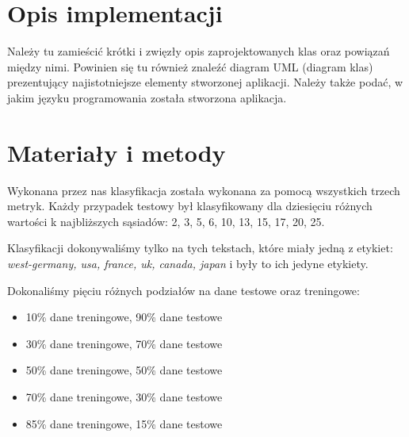 \documentclass{classrep}
\begin{document}
\begin{enumerate}

\end{enumerate}





\section{Opis implementacji} %
{\color{blue}
Należy tu zamieścić krótki i zwięzły opis zaprojektowanych klas oraz powiązań
między nimi. Powinien się tu również znaleźć diagram UML  (diagram klas)
prezentujący najistotniejsze elementy stworzonej aplikacji. Należy także
podać, w jakim języku programowania została stworzona aplikacja. }

\section{Materiały i metody} %
Wykonana przez nas klasyfikacja została wykonana za pomocą wszystkich trzech metryk. Każdy przypadek testowy był klasyfikowany dla dziesięciu różnych wartości k najbliższych sąsiadów: 2, 3, 5, 6, 10, 13, 15, 17, 20, 25.

Klasyfikacji dokonywaliśmy tylko na tych tekstach, które miały jedną z etykiet: \textsl{west-germany, usa, france, uk, canada, japan} i były to ich jedyne etykiety.

Dokonaliśmy pięciu różnych podziałów na dane testowe oraz treningowe:
\begin{itemize}
\item 10\% dane treningowe, 90\% dane testowe
\item 30\% dane treningowe, 70\% dane testowe
\item 50\% dane treningowe, 50\% dane testowe
\item 70\% dane treningowe, 30\% dane testowe
\item 85\% dane treningowe, 15\% dane testowe
\end{itemize}
\end{document}

